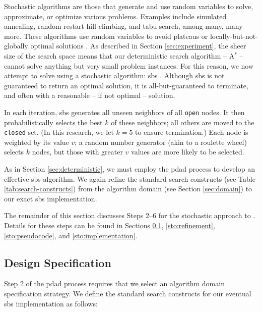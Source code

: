 \documentclass[../main.tex]{subfiles}
\begin{document}
Stochastic algorithms are those that generate and use random variables to solve, approximate, or optimize various problems. Examples include simulated annealing, random-restart hill-climbing, and tabu search, among many, many more. These algorithms use random variables to avoid plateaus or locally-but-not-globally optimal solutions \cite{wikipedia:stochastic-optimization, Brownlee2011}. As described in Section \ref{sec:experiment}, the sheer size of the \probs search space means that our deterministic search algorithm -- A$^*$ -- cannot solve anything but very small problem instances. For this reason, we now attempt to solve \probs using a stochastic algorithm: \ac{sbs} \cite{wikipedia:beam-search}. Although \ac{sbs} is not guaranteed to return an optimal solution, it is all-but-guaranteed to terminate, and often with a reasonable -- if not optimal -- solution.

In each iteration, \ac{sbs} generates all unseen neighbors of all \texttt{open} nodes. It then probabilistically selects the best $k$ of these neighbors; all others are moved to the \texttt{closed} set. (In this research, we let $k=5$ to ensure termination.) Each node is weighted by its value $v$; a random number generator (akin to a roulette wheel) selects $k$ nodes, but those with greater $v$ values are more likely to be selected.

As in Section \ref{sec:deterministic}, we must employ the \ac{pdad} process to develop an effective \ac{sbs} algorithm. We again refine the standard search constructs (see Table \ref{tab:search-constructs}) from the algorithm domain (see Section \ref{sec:domain}) to our exact \ac{sbs} implementation.

The remainder of this section discusses Steps 2--6 for the stochastic approach to \prob. Details for these steps can be found in Sections \ref{sto:specification}, \ref{sto:refinement}, \ref{sto:pseudocode}, and \ref{sto:implementation}.

\subsection{Design Specification}\label{sto:specification}

Step 2 of the \ac{pdad} process requires that we select an algorithm domain specification strategy. We define the standard search constructs for our eventual \ac{sbs} implementation as follows:
\end{document}
